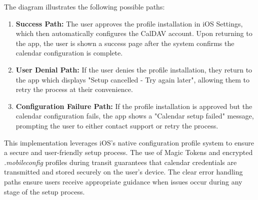 The diagram illustrates the following possible paths:
\begin{enumerate}
  \item \textbf{Success Path:} The user approves the profile installation in iOS Settings, which then automatically configures the CalDAV account. Upon returning to the app, the user is shown a success page after the system confirms the calendar configuration is complete.
  \item \textbf{User Denial Path:} If the user denies the profile installation, they return to the app which displays "Setup cancelled - Try again later", allowing them to retry the process at their convenience.
  \item \textbf{Configuration Failure Path:} If the profile installation is approved but the calendar configuration fails, the app shows a "Calendar setup failed" message, prompting the user to either contact support or retry the process.
\end{enumerate}

This implementation leverages iOS's native configuration profile system to ensure a secure and user-friendly setup process. The use of Magic Tokens and encrypted \textit{.mobileconfig} profiles during transit guarantees that calendar credentials are transmitted and stored securely on the user's device. The clear error handling paths ensure users receive appropriate guidance when issues occur during any stage of the setup process.